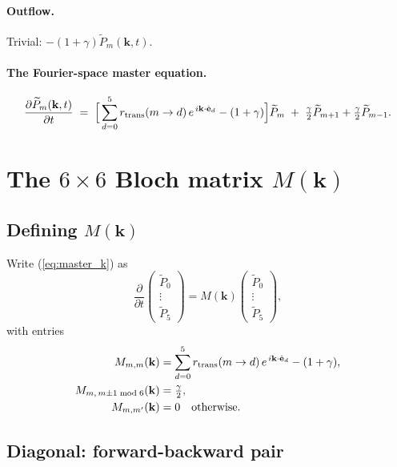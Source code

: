 \documentclass[11pt,a4paper]{article}
\newcommand{\nn}{\nonumber \\}
\newcommand{\vk}{\mathbf{k}}
\newcommand{\veps}[1]{\hat{\mathbf{e}}_{#1}}
\newcommand{\Ptilde}{\widetilde{P}}
\begin{document}
\paragraph{Outflow.} Trivial: $-(1 + \gamma) \Ptilde_m(\vk, t)$.

\paragraph{The Fourier-space master equation.}
\begin{correctbox}
\begin{equation}\label{eq:master_k}
\frac{\partial \Ptilde_m(\vk, t)}{\partial t}
\;=\; \Big[\sum_{d=0}^{5} r_{\rm trans}(m \to d)\, e^{\,i\vk \cdot \veps{d}} - (1 + \gamma)\Big] \Ptilde_m
\;+\; \tfrac{\gamma}{2}\Ptilde_{m+1} + \tfrac{\gamma}{2}\Ptilde_{m-1}.
\end{equation}
\end{correctbox}

\section{The $6 \times 6$ Bloch matrix $M(\vk)$}\label{sec:bloch}

\subsection{Defining $M(\vk)$}\label{ssec:Mk_def}

Write (\ref{eq:master_k}) as
\[
\frac{\partial}{\partial t}\!\begin{pmatrix} \Ptilde_0 \\ \vdots \\ \Ptilde_5 \end{pmatrix}
= M(\vk) \begin{pmatrix} \Ptilde_0 \\ \vdots \\ \Ptilde_5 \end{pmatrix},
\]
with entries
\begin{align}\label{eq:Mk_entries}
M_{m,m}(\vk) &= \sum_{d=0}^{5} r_{\rm trans}(m \to d)\, e^{\,i\vk\cdot\veps{d}} - (1+\gamma), \nn
M_{m,\, m\pm 1 \bmod 6}(\vk) &= \tfrac{\gamma}{2}, \nn
M_{m, m'}(\vk) &= 0 \quad \text{otherwise.}
\end{align}

\subsection{Diagonal: forward-backward pair}\label{ssec:diag_fb}
\end{document}
